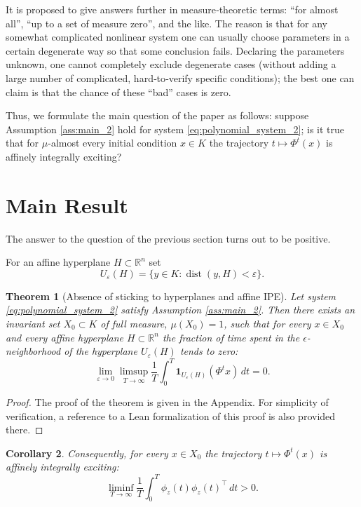 \documentclass[10pt,a4paper]{amsart}
\newcommand{\R}{\mathbb{R}}
\newcommand{\eps}{\varepsilon}
\newcommand{\dd}{\,d}
\DeclareMathOperator{\dist}{dist}
\newtheorem{theorem}{Theorem}
\newtheorem{corollary}[theorem]{Corollary}
\begin{document}
It is proposed to give answers further in measure‑theoretic terms: “for almost all”, “up to a set of measure zero”, and the like. The reason is that for any somewhat complicated nonlinear system one can usually choose parameters in a certain degenerate way so that some conclusion fails. Declaring the parameters unknown, one cannot completely exclude degenerate cases (without adding a large number of complicated, hard‑to‑verify specific conditions); the best one can claim is that the chance of these “bad” cases is zero.

Thus, we formulate the main question of the paper as follows: suppose Assumption \ref{ass:main_2} hold for system \ref{eq:polynomial_system_2}; is it true that for $\mu$-almost every initial condition $x\in K$ the trajectory $t\mapsto\Phi^t(x)$ is affinely integrally exciting?



\section{Main Result}
\label{sec:main_result_2}


 The answer to the question of the previous section turns out to be positive.


For an affine hyperplane $H\subset\R^n$ set
\[
    U_\eps(H)=\{y\in K:\dist(y,H)<\eps\}.
\]


\begin{theorem}[Absence of sticking to hyperplanes and affine IPE]
\label{thm:main_nonsticking_2}
Let system \ref{eq:polynomial_system_2} satisfy Assumption \ref{ass:main_2}. Then there exists an invariant set $X_0\subset K$ of full measure, $\mu(X_0)=1$, such that for every $x\in X_0$ and every affine hyperplane $H\subset\R^n$ the fraction of time spent in the $\epsilon$-neighborhood of the hyperplane $U_\eps(H)$ tends to zero:
\begin{equation}\label{eq:main_nonsticking_2}
    \lim_{\eps\to0}\limsup_{T\to\infty}
    \frac1T\int_0^T\mathbf 1_{U_\eps(H)}(\Phi^t x)\dd t=0.
\end{equation}

\end{theorem}

\begin{proof}
    The proof of the theorem is given in the Appendix. For simplicity of verification, a reference to a Lean formalization of this proof is also provided there.
\end{proof}

\begin{corollary}
   Consequently, for every $x\in X_0$ the trajectory $t\mapsto\Phi^t(x)$ is affinely integrally exciting:
\begin{equation}\label{eq:main_ipe_2}
    \liminf_{T\to\infty}
    \frac1T\int_0^T \phi_z(t)\phi_z(t)^\top\dd t
    >0.
\end{equation}
\end{corollary}
\end{document}
